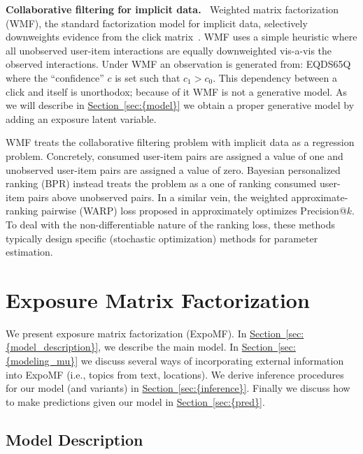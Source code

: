 \documentclass{sig-alternate-arxiv}
\begin{document}
{\vspace{0.1in}\noindent \textbf{{Collaborative filtering for implicit data.} \,}} Weighted
matrix factorization (WMF), the standard factorization model for implicit
data, selectively downweights evidence from the click
matrix~\cite{hu2008collaborative}.  WMF uses a simple heuristic where all
unobserved user-item interactions are equally downweighted vis-a-vis the
observed interactions. Under WMF an observation is generated from:
EQDS65Q
where the ``confidence'' $c$ is set such that $c_1 > c_0$. This dependency between a
click and itself is unorthodox; because of it WMF is not a generative
model. As we will describe in {\hyperref[sec:{model}]{Section~\ref*{sec:{model}}}} we obtain a proper generative
model by adding an exposure latent variable. 

WMF treats the collaborative filtering problem with implicit data as a
regression problem. Concretely, consumed user-item pairs are assigned a
value of one and unobserved user-item pairs are assigned a value of zero.
Bayesian personalized ranking (BPR) \cite{rendle2009bpr,
rendle2014improving} instead treats the problem as a one of ranking
consumed user-item pairs above unobserved pairs.
In a similar vein, the weighted approximate-ranking pairwise (WARP) loss
proposed in \citet{weston2011wsabie} approximately optimizes Precision@$k$. 
To deal with the non-differentiable nature of the ranking
loss, these methods typically design specific (stochastic optimization)
methods for parameter estimation.

 \section{Exposure Matrix Factorization}\label{sec:model}

We present exposure matrix factorization (ExpoMF). 
In {\hyperref[sec:{model_description}]{Section~\ref*{sec:{model_description}}}}, we describe the main model. 
In {\hyperref[sec:{modeling_mu}]{Section~\ref*{sec:{modeling_mu}}}} we discuss several ways 
of incorporating external information into ExpoMF (i.e., topics from text, locations). 
We derive inference procedures for our model (and variants) in {\hyperref[sec:{inference}]{Section~\ref*{sec:{inference}}}}. Finally we discuss how to make predictions given our model in {\hyperref[sec:{pred}]{Section~\ref*{sec:{pred}}}}.

\subsection{Model Description}
\label{sec:model_description}
\end{document}
